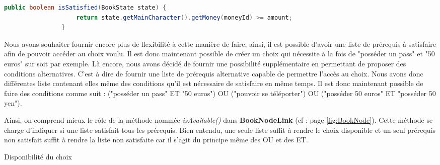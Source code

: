 			\begin{lstlisting}[gobble=16, language=java, caption=RequirementMoney.isSatisfied(), label=lst:isSatisfied]
				public boolean isSatisfied(BookState state) {
					return state.getMainCharacter().getMoney(moneyId) >= amount;
				}
			\end{lstlisting}

			Nous avons souhaiter fournir encore plus de flexibilité à cette manière de faire, ainsi, il est possible d'avoir une liste de prérequis à satisfaire afin de pouvoir accéder au choix voulu. Il est donc maintenant possible de créer un choix qui nécessite à la fois de "posséder un pass" et "50 euros" sur soit par exemple. Là encore, nous avons décidé de fournir une possibilité supplémentaire en permettant de proposer des conditions alternatives. C'est à dire de fournir une liste de prérequis alternative capable de permettre l'accès au choix. Nous avons donc différentes liste contenant elles même des conditions qu'il est nécessaire de satisfaire en même temps. Il est donc maintenant possible de faire des conditions comme suit : ("posséder un pass" ET "50 euros") OU ("pouvoir se téléporter") OU ("posséder 50 euros" ET "posséder 50 yen").

			Ainsi, on comprend mieux le rôle de la méthode nommée \textit{isAvailable()} dans \textbf{BookNodeLink} (cf :  page \ref{fig:BookNode}). Cette méthode se charge d'indiquer si une liste satisfait tous les prérequis. Bien entendu, une seule liste suffit à rendre le choix disponible et un seul prérequis non satisfait suffit à rendre la liste non satisfaite car il s'agit du principe même des OU et des ET.


			\begin{algorithm}[H]
				\DontPrintSemicolon

				\;
				\;

				\caption{Disponibilité du choix}
			\end{algorithm}

